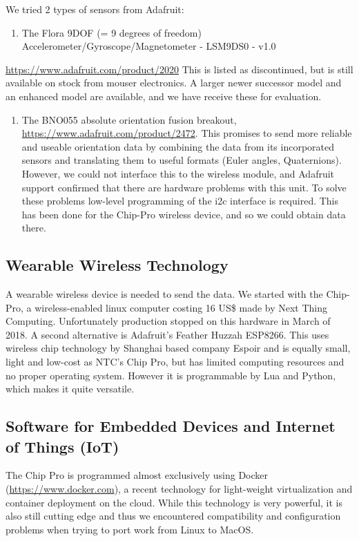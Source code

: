 \documentclass[11pt]{article}
\begin{document}
We tried 2 types of sensors from Adafruit: 

\begin{enumerate}
\item The Flora 9DOF (= 9 degrees of freedom) Accelerometer/Gyroscope/Magnetometer - LSM9DS0 - v1.0
\end{enumerate}
\url{https://www.adafruit.com/product/2020}  This is listed as discontinued, but is still available on stock from mouser electronics.  A larger newer successor model and an enhanced model are available, and we have receive these for evaluation. 
\begin{enumerate}
\item The BNO055 absolute orientation fusion breakout, \url{https://www.adafruit.com/product/2472}. This promises to send more reliable and useable orientation data by combining the data from its incorporated sensors and translating them to useful formats (Euler angles, Quaternions).  However, we could not interface this to the wireless module, and Adafruit support confirmed that there are hardware problems with this unit. To solve these problems low-level programming of the i2c interface is required.  This has been done for the Chip-Pro wireless device, and so we could obtain data there.
\end{enumerate}

\subsection{Wearable Wireless Technology}
\label{sec:org8459a6d}

A wearable wireless device is needed to send the data.  We started with the Chip-Pro, a wireless-enabled linux computer costing 16 US\$ made by Next Thing Computing.  Unfortunately production stopped on this hardware in March of 2018.  A second alternative is Adafruit's Feather Huzzah ESP8266.  This uses wireless chip technology by Shanghai based company Espoir and is equally small, light and low-cost as NTC's Chip Pro, but has limited computing resources and no proper operating system. However it is programmable by Lua and Python, which makes it quite versatile. 

\subsection{Software for Embedded Devices and Internet of Things (IoT)}
\label{sec:orgcc857b4}

The Chip Pro is programmed almost exclusively using Docker (\url{https://www.docker.com}), a recent technology for light-weight virtualization and container deployment on the cloud.  While this technology is very powerful, it is also still cutting edge and thus we encountered compatibility and configuration problems when trying to port work from Linux to MacOS.
\end{document}
